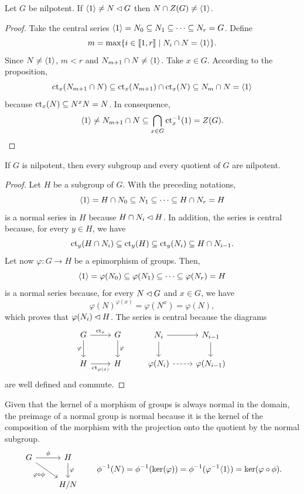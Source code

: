 \begin{cor}\label{normal-nilpotent-center}
    Let\/ $G$ be nilpotent. If\/ $\langle1\rangle\ne N\lhd G$ then\/ $N\cap Z(G)\ne\langle1\rangle$.
\end{cor}

\begin{proof} Take the central series $\langle1\rangle=N_0\subseteq N_1\subseteq\cdots\subseteq N_r=G$. Define
$$
    m = \max\{i\in\llbracket1,r\rrbracket\mid N_i\cap N=\langle1\rangle\}.
$$
Since $N\ne\langle1\rangle$, $m<r$ and $N_{m+1}\cap N\ne\langle1\rangle$. Take $x\in G$. According to the proposition,
$$
    \operatorname{\operatorname{ct}}_x(N_{m+1}\cap N)\subseteq\operatorname{\operatorname{ct}}_x(N_{m+1})\cap\operatorname{\operatorname{ct}}_x(N)\subseteq N_m\cap N
        =\langle1\rangle
$$
because $\operatorname{\operatorname{ct}}_x(N)\subseteq N^xN=N$. In consequence,
$$
    \langle1\rangle\ne N_{m+1}\cap N \subseteq\bigcap_{x\in G}\operatorname{\operatorname{ct}}_x^{-1}(1)=Z(G).
$$
 \end{proof}



\begin{cor}\label{nilpotent-subgroups-and-quotients}
    If\/ $G$ is nilpotent, then every subgroup and every quotient of\/ $G$ are nilpotent.
\end{cor}

\begin{proof} Let $H$ be a subgroup of $G$. With the preceding notations,
$$
    \langle1\rangle=H\cap N_0\subseteq N_1\subseteq\cdots\subseteq H\cap N_r=H
$$
is a normal series in $H$ because $H\cap N_i\lhd H$. In addition, the series is central because, for every $y\in H$, we have
$$
    \operatorname{\operatorname{ct}}_y(H\cap N_i)\subseteq\operatorname{\operatorname{ct}}_y(H)\subseteq\operatorname{\operatorname{ct}}_y(N_i)\subseteq H\cap N_{i-1}.
$$
Let now $\varphi\colon G\to H$ be a epimorphism of groups. Then,
$$
    \langle1\rangle=\varphi(N_0)\subseteq\varphi(N_1)\subseteq\cdots\subseteq\varphi(N_r)=H
$$
is a normal series because, for every $N\lhd G$ and $x\in G$, we have
$$
    \varphi(N)^{\varphi(x)}=\varphi(N^x)=\varphi(N),
$$
which proves that $\varphi(N_i)\lhd H$. The series is central because the diagrams
$$
    \begin{tikzcd}
        G \arrow[r, "\ct_x"] \arrow[d, "\varphi"'] & G \arrow[d, "\varphi"] & N_i \arrow[r] \arrow[d] & N_{i-1} \arrow[d] \\
        H \arrow[r, "\ct_{\varphi(x)}"'] & H & \varphi(N_i) \arrow[r, dashed] & \varphi(N_{i-1}) 
    \end{tikzcd}
$$
are well defined and commute.  \end{proof}

\begin{rem}\label{preimage-of-normal}
    Given that the kernel of a morphism of groups is always normal in the domain, the preimage of a normal group is normal because it is the kernel of the composition of the morphism with the projection onto the quotient by the normal subgroup.
    $$
        \begin{tikzcd}
            G \arrow[r,"\phi"] \arrow[rd,"\varphi\circ\phi"'] & H \arrow[d,"\varphi"] \\
            & H/N
        \end{tikzcd}\qquad \phi^{-1}(N)=\phi^{-1}(\ker(\varphi))=\phi^{-1}(\varphi^{-1}\gen1)=\ker(\varphi\circ\phi).
    $$
\end{rem}

